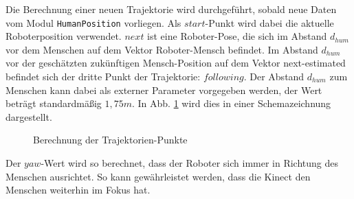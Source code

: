 Die Berechnung einer neuen Trajektorie wird durchgeführt, sobald neue Daten vom Modul \lstinline{HumanPosition} vorliegen.
Als $start$-Punkt wird dabei die aktuelle Roboterposition verwendet.
$next$ ist eine Roboter-Pose, die sich im Abstand $d_{hum}$ vor dem Menschen auf dem Vektor Roboter-Mensch befindet.
Im Abstand $d_{hum}$ vor der geschätzten zukünftigen Mensch-Position auf dem Vektor next-estimated befindet sich der dritte Punkt der Trajektorie: $following$.
Der Abstand $d_{hum}$ zum Menschen kann dabei als externer Parameter vorgegeben werden, der Wert beträgt standardmäßig $1,75m$.
In Abb. \ref{fig:trajektorie} wird dies in einer Schemazeichnung dargestellt.

\begin{figure}[h]
	\center
	
	\caption{Berechnung der Trajektorien-Punkte}
	\label{fig:trajektorie}
\end{figure}

Der $yaw$-Wert wird so berechnet, dass der Roboter sich immer in Richtung des Menschen ausrichtet.
So kann gewährleistet werden, dass die Kinect den Menschen weiterhin im Fokus hat.



